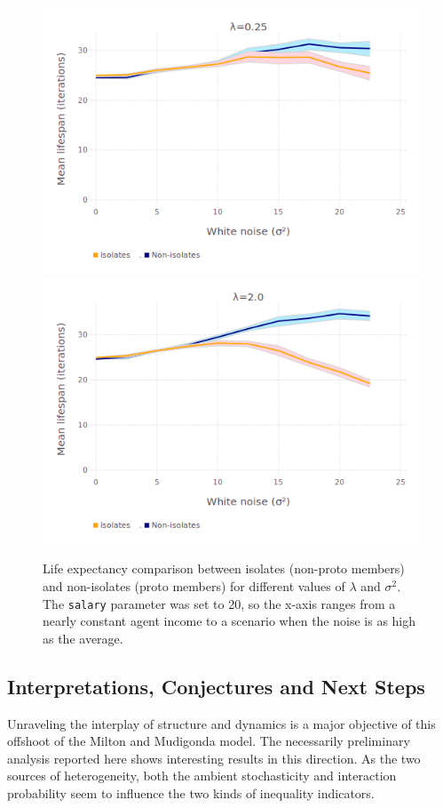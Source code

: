 \begin{figure}[ht]
\centering
\includegraphics[width=\columnwidth]{figures/avgLifespanLambda_025.png}
\includegraphics[width=\columnwidth]{figures/avgLifespanLambda2.png}
\caption{Life expectancy comparison between isolates (non-proto members) and
non-isolates (proto members) for different values of $\lambda$ and $\sigma^2$.
The \texttt{salary} parameter was set to 20, so the x-axis ranges from a nearly
constant agent income to a scenario when the noise is as high as the average.}
\label{fig:avgLifespanLambda}
\end{figure}

\subsection{Interpretations, Conjectures and Next Steps}
Unraveling the interplay of structure and dynamics is a major objective of this offshoot of the Milton and Mudigonda model. The necessarily preliminary analysis reported here shows interesting results in this direction. As the two sources of heterogeneity, both the ambient stochasticity and interaction probability seem to influence the two kinds of inequality indicators. 

